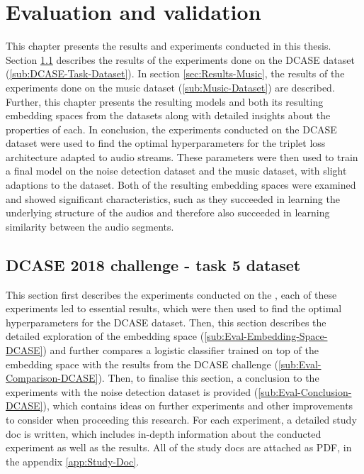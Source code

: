 \chapter{Evaluation and validation}
\label{ch:Evalutation-Validation}
This chapter presents the results and experiments conducted in this thesis. Section \ref{sec:Results-DCASE} describes the results of the experiments done on the \gls{DCASE} dataset (\ref{sub:DCASE-Task-Dataset}). In section \ref{sec:Results-Music}, the results of the experiments done on the music dataset (\ref{sub:Music-Dataset}) are described. Further, this chapter presents the resulting models and both its resulting embedding spaces from the datasets along with detailed insights about the properties of each.
\newline
\newline
In conclusion, the experiments conducted on the \gls{DCASE} dataset were used to find the optimal hyperparameters for the triplet loss architecture adapted to audio streams. These parameters were then used to train a final model on the noise detection dataset and the music dataset, with slight adaptions to the dataset. Both of the resulting embedding spaces were examined and showed significant characteristics, such as they succeeded in learning the underlying structure of the audios and therefore also succeeded in learning similarity between the audio segments.

\section{DCASE 2018 challenge - task 5 dataset}
\label{sec:Results-DCASE}
This section first describes the experiments conducted on the , each of these experiments led to essential results, which were then used to find the optimal hyperparameters for the \gls{DCASE} dataset. Then, this section describes the detailed exploration of the embedding space (\ref{sub:Eval-Embedding-Space-DCASE}) and further compares a logistic classifier trained on top of the embedding space with the results from the \gls{DCASE} challenge (\ref{sub:Eval-Comparison-DCASE}). Then, to finalise this section, a conclusion to the experiments with the noise detection dataset is provided (\ref{sub:Eval-Conclusion-DCASE}), which contains ideas on further experiments and other improvements to consider when proceeding this research. 
\newline
\newline
For each experiment, a detailed study doc is written, which includes in-depth information about the conducted experiment as well as the results. All of the study docs are attached as PDF, in the appendix \ref{app:Study-Doc}.

